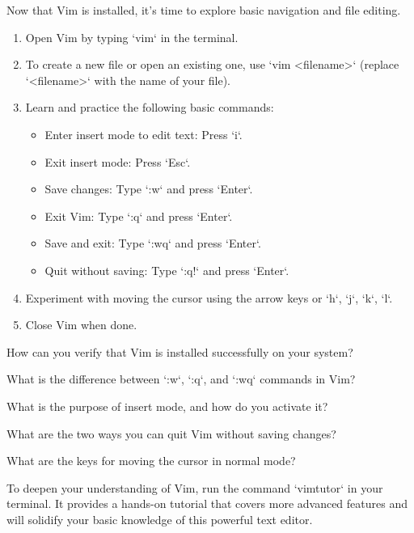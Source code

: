 \begin{challenge}
\begin{task}
Now that Vim is installed, it’s time to explore basic navigation and file editing.

\begin{enumerate}
    \item Open Vim by typing `vim` in the terminal.
    \item To create a new file or open an existing one, use `vim <filename>` (replace `<filename>` with the name of your file).
    \item Learn and practice the following basic commands:
        \begin{itemize}
            \item Enter insert mode to edit text: Press `i`.
            \item Exit insert mode: Press `Esc`.
            \item Save changes: Type `:w` and press `Enter`.
            \item Exit Vim: Type `:q` and press `Enter`.
            \item Save and exit: Type `:wq` and press `Enter`.
            \item Quit without saving: Type `:q!` and press `Enter`.
        \end{itemize}
    \item Experiment with moving the cursor using the arrow keys or `h`, `j`, `k`, `l`.
    \item Close Vim when done.
\end{enumerate}
\end{task}

\begin{questions}
    \item How can you verify that Vim is installed successfully on your system?
    \item What is the difference between `:w`, `:q`, and `:wq` commands in Vim?
    \item What is the purpose of insert mode, and how do you activate it?
    \item What are the two ways you can quit Vim without saving changes?
    \item What are the keys for moving the cursor in normal mode?
\end{questions}

\begin{advise}
To deepen your understanding of Vim, run the command `vimtutor` in your terminal. It provides a hands-on tutorial that covers more advanced features and will solidify your basic knowledge of this powerful text editor.
\end{advise}

\end{challenge}
